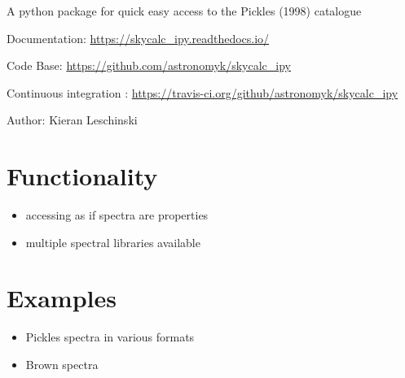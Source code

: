 
A python package for quick easy access to the Pickles (1998) catalogue

Documentation: \url{https://skycalc_ipy.readthedocs.io/}

Code Base: \url{https://github.com/astronomyk/skycalc_ipy}

Continuous integration : \url{https://travis-ci.org/github/astronomyk/skycalc_ipy}

Author: Kieran Leschinski


\section{Functionality%
  \label{functionality}%
}

\begin{itemize}
\item accessing as if spectra are properties

\item multiple spectral libraries available
\end{itemize}


\section{Examples%
  \label{examples}%
}

\begin{itemize}
\item Pickles spectra in various formats

\item Brown spectra
\end{itemize}
